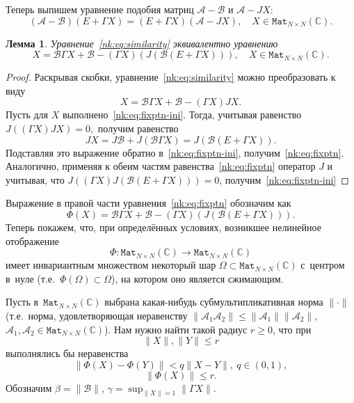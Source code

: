 \documentclass[14pt,a4paper]{extarticle}
\numberwithin{equation}{section}
\newtheorem{lem}{Лемма}
\theoremstyle{definition}
\begin{document}
Теперь выпишем уравнение подобия матриц \( \mathcal{A} - \mathcal{B} \)
и \( \mathcal{A} - J X \):
\begin{equation}\label{nk:eq:similarity}
    (\mathcal{A-B})(E+\Gamma X) = (E+\Gamma X)(\mathcal{A} - J X), \quad X\in\mathtt{Mat}_{N{\times}N}(\mathbb{C}).
\end{equation}
\begin{lem}
    Уравнение~\eqref{nk:eq:similarity} эквивалентно уравнению
    \begin{equation}\label{nk:eq:fixptn}
        X = \mathcal{B} \Gamma X + \mathcal{B} - (\Gamma X)(J(\mathcal{B} (E + \Gamma X))), \quad X\in\mathtt{Mat}_{N{\times}N}(\mathbb{C}).
    \end{equation}
\end{lem}
\begin{proof}
Раскрывая скобки, уравнение~\eqref{nk:eq:similarity} можно преобразовать к виду
\begin{equation}\label{nk:eq:fixptn-ini}
    X = \mathcal{B} \Gamma X + \mathcal{B} - (\Gamma X) J X.
\end{equation}
Пусть для \( X \) выполнено~\eqref{nk:eq:fixptn-ini}.
Тогда, учитывая равенство \( J\left((\Gamma X)JX\right) = 0, \)
получим равенство
    \begin{equation}\label{nk:eq:jx}
        J X = J\mathcal{B} + J\left(\mathcal{B}\Gamma X\right) = J(\mathcal{B} (E + \Gamma X)).
    \end{equation}
Подставляя это выражение обратно в~\eqref{nk:eq:fixptn-ini},
    получим~\eqref{nk:eq:fixptn}.
Аналогично, применяя к обеим частям равенства~\eqref{nk:eq:fixptn} оператор \( J \)
    и учитывая, что \( J\left( (\Gamma X)J(\mathcal{B} (E + \Gamma X)) \right) = 0 \),
    получим~\eqref{nk:eq:fixptn-ini}
\end{proof}

Выражение в правой части уравнения~\eqref{nk:eq:fixptn} обозначим как
\[
    \Phi(X) = \mathcal{B} \Gamma X + \mathcal{B} - (\Gamma X)(J(\mathcal{B} (E + \Gamma X))).\]
Теперь покажем, что, при определ\"енных условиях,
возникшее нелинейное отображение
\[ \Phi:\mathtt{Mat}_{N{\times}N}(\mathbb{C})\to \mathtt{Mat}_{N{\times}N}(\mathbb{C}) \]
имеет инвариантным множеством
некоторый шар \( \Omega \subset \mathtt{Mat}_{N{\times}N}(\mathbb{C}) \) с~центром в~нуле
(т.е.~\( \Phi(\Omega)\subset\Omega \)),
на котором оно является сжимающим.

Пусть в~\( \mathtt{Mat}_{N{\times}N}(\mathbb{C}) \)
выбрана какая-нибудь суб\-мульти\-пликативная норма \( \|\cdot\| \)
(т.е.~норма, удовле\-творя\-ющая неравенству
 \( \| \mathcal{A}_1\mathcal{A}_2 \| \leq \|\mathcal{A}_1\|\|\mathcal{A}_2\|, \)
 \( \mathcal{A}_1, \mathcal{A}_2 \in \mathtt{Mat}_{N{\times}N}(\mathbb{C}) \)).
Нам нужно найти такой радиус \( r \geq 0 \),
что при \[ \|X\|,\|Y\| \leq r \]
выполнялись бы неравенства
\[ \|\Phi(X) - \Phi(Y)\| < q\|X-Y\|,\ q\in(0,1), \]
\[ \|\Phi(X)\| \leq r. \]
Обозначим
\( \beta = \|\mathcal{B}\| \), \( \gamma = \sup_{\|X\|=1} \|\Gamma X\| \).
\end{document}

